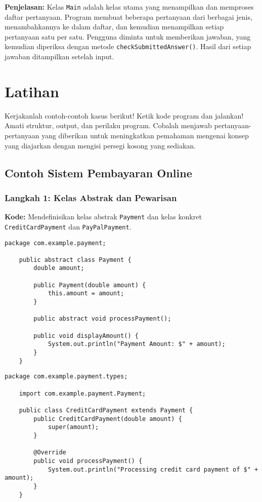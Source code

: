\textbf{Penjelasan:} Kelas \texttt{Main} adalah kelas utama yang menampilkan dan memproses daftar pertanyaan. Program membuat beberapa pertanyaan dari berbagai jenis, menambahkannya ke dalam daftar, dan kemudian menampilkan setiap pertanyaan satu per satu. Pengguna diminta untuk memberikan jawaban, yang kemudian diperiksa dengan metode \texttt{checkSubmittedAnswer()}. Hasil dari setiap jawaban ditampilkan setelah input.

\section{Latihan}


Kerjakanlah contoh-contoh kasus berikut! Ketik kode program dan jalankan! Amati struktur, output, dan perilaku program. Cobalah menjawab pertanyaan-pertanyaan yang diberikan untuk meningkatkan pemahaman mengenai konsep yang diajarkan dengan mengisi persegi kosong yang sediakan.

\subsection{Contoh Sistem Pembayaran Online}

\subsubsection{Langkah 1: Kelas Abstrak dan Pewarisan}

\textbf{Kode:} Mendefinisikan kelas abstrak \texttt{Payment} dan kelas konkret \texttt{CreditCardPayment} dan \texttt{PayPalPayment}.

\begin{lstlisting}[style=JavaStyle, caption={Payment.java}]
	package com.example.payment;
	
	public abstract class Payment {
		double amount;
		
		public Payment(double amount) {
			this.amount = amount;
		}
		
		public abstract void processPayment();
		
		public void displayAmount() {
			System.out.println("Payment Amount: $" + amount);
		}
	}
\end{lstlisting}

\begin{lstlisting}[style=JavaStyle, caption={CreditCardPayment.java}]
	package com.example.payment.types;
	
	import com.example.payment.Payment;
	
	public class CreditCardPayment extends Payment {
		public CreditCardPayment(double amount) {
			super(amount);
		}
		
		@Override
		public void processPayment() {
			System.out.println("Processing credit card payment of $" + amount);
		}
	}
\end{lstlisting}

